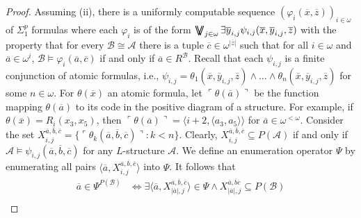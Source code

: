 \documentclass[11pt]{amsart}
\DeclareMathOperator*{\bigdoublevee}{\bigvee\mkern-15mu\bigvee}
\newcommand{\A}{{\mathcal{A}}}
\newcommand{\B}{{\mathcal{B}}}
\renewcommand{\bar}[1]{\overline{#1}}
\renewcommand{\phi}{\varphi}
\begin{document}
\begin{proof} Assuming (ii), there is a uniformly computable sequence $(\phi_i(\overline x,\overline z))_{i\in\omega}$ of $\Sigma_1^p$ formulas where each $\phi_i$ is of the form $\bigdoublevee_{j \in \omega} \exists \overline{y}_{i,j} \psi_{i,j} (\overline{x},\overline{y}_{i,j},\overline{z})$ with the property that for every $\B\cong \A$ there is a tuple $\bar c\in \omega^{|\bar z|}$ such that for all $i\in\omega$ and $\bar a\in\omega^{i}$, $\B\models \varphi_i(\bar a,\bar c)$ if and only if $\bar a \in R^{\B}$.
Recall that each $\psi_{i,j}$ is a finite conjunction of atomic formulas, i.e., $\psi_{i,j}=\theta_1(\overline x, \overline y_{i,j},\overline z)\land \dots \land \theta_n(\overline x, \overline y_{i,j},\overline z)$ for some $n\in \omega$. For $\theta(\overline x)$ an atomic formula, let $\ulcorner \theta(\overline a)\urcorner$ be the function mapping $\theta(\overline a)$ to its code in the positive diagram of a structure. For example, if $\theta(\overline x)=R_i(x_3,x_5)$, then $\ulcorner \theta(\overline a)\urcorner=\langle i+2, \langle a_3,a_5\rangle\rangle$ for $\overline a\in \omega^{<\omega}$. Consider the set $X^{\overline a, \overline b,\overline c}_{i,j}=\{\ulcorner \theta_k(\overline a,\overline b,\overline c)\urcorner: k<n\}$. Clearly, $X^{\overline a,\overline b,\overline c}_{i,j}\subseteq P(\A)$ if and only if $\A\models \psi_{i,j}(\overline a,\overline b,\overline c)$ for any $L$-structure $\A$. We define an enumeration operator $\Psi$ by enumerating all pairs %
$\langle \overline a,X_{i,j}^{\overline a,\overline b,\overline c}\rangle$ into $\Psi$. It follows that 
\begin{align*}
    \overline a\in \Psi^{P(\B)}&\Leftrightarrow \exists \langle \overline a,X_{|\overline a|,j}^{\overline a, \overline b, \overline c}\rangle \in \Psi \land X_{|\overline a|,j}^{\overline a, \overline b\overline c}\subseteq P(\B)\\

\end{align*}
\end{proof}
\end{document}
